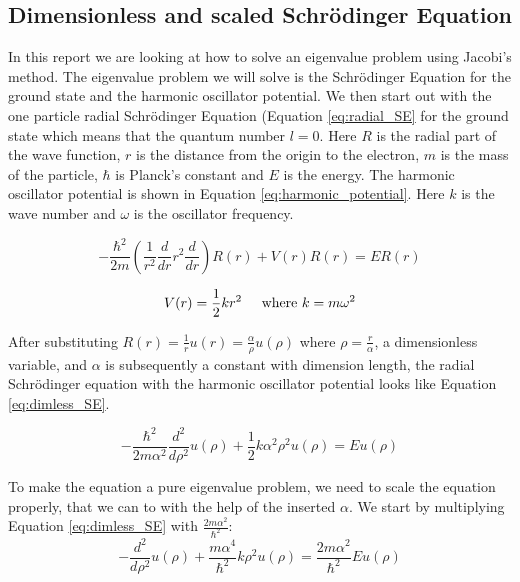 \subsection{Dimensionless and scaled Schrödinger Equation}

In this report we are looking at how to solve an eigenvalue problem using Jacobi's method. The eigenvalue problem we will solve is the Schrödinger Equation for the ground state and the harmonic oscillator potential. 
We then start out with the one particle radial Schrödinger Equation (Equation \ref{eq:radial_SE} for the ground state which means that the quantum number $l = 0$. Here $R$ is the radial part of the wave function, $r$ is the distance from the origin to the electron, $m$ is the mass of the particle, $\hbar$ is Planck's constant and $E$ is the energy. The harmonic oscillator potential is shown in Equation \ref{eq:harmonic_potential}. Here $k$ is the wave number and $\omega$ is the oscillator frequency.

\begin{equation}\label{eq:radial_SE}
- \frac{\hbar^2}{2m}\left(\frac{1}{r^2}\frac{d}{dr}r^2\frac{d}{dr}\right)R(r) + V(r)R(r) = ER(r)
\end{equation}

\begin{equation}\label{eq:harmonic_potential}
V(r) = \frac{1}{2}kr^2 \hspace{0.5cm} \text{where } k = m \omega^2 
\end{equation}

After substituting $R(r) = \frac{1}{r}u(r) = \frac{\alpha}{\rho} u(\rho )$ where $\rho = \frac{r}{\alpha}$, a dimensionless variable, and $\alpha$ is subsequently a constant with dimension length, the radial Schrödinger equation with the harmonic oscillator potential looks like Equation \ref{eq:dimless_SE}.

\begin{equation}\label{eq:dimless_SE}
- \frac{\hbar^2}{2m\alpha^2}\frac{d^2}{d\rho^2}u(\rho ) + \frac{1}{2}k\alpha^2 \rho^2 u(\rho ) = Eu(\rho )
\end{equation}

To make the equation a pure eigenvalue problem, we need to scale the equation properly, that we can to with the help of the inserted $\alpha$. We start by multiplying Equation \ref{eq:dimless_SE} with $\frac{2m \alpha^2}{\hbar^2}$:
\[
-\frac{d^2}{d\rho^2}u(\rho ) + \frac{m\alpha^4}{\hbar^2}k\rho^2 u(\rho ) = \frac{2m\alpha^2}{\hbar^2}E u(\rho )
\]

